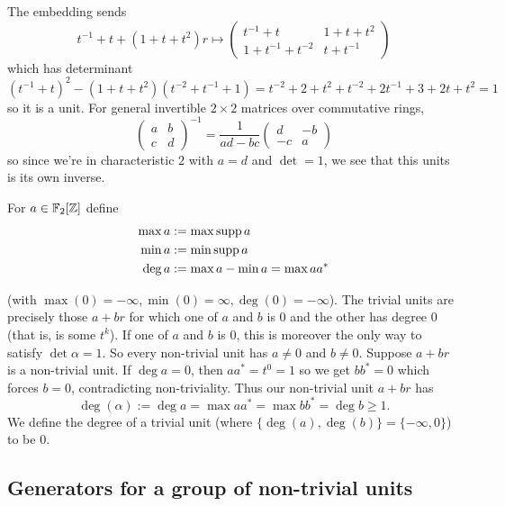 \begin{example}
    The embedding sends \[
        t^{-1} + t + (1 + t + t^2)r \mapsto \begin{pmatrix}
            t^{-1} + t & 1 + t + t^2 \\
            1 + t^{-1} + t^{-2} & t + t^{-1}
        \end{pmatrix}
    \] which has determinant \[
        (t^{-1} + t)^2  - (1 + t + t^2)(t^{-2} + t^{-1} + 1) = t^{-2} + 2 + t^2 + t^{-2} + 2t^{-1} + 3 + 2t + t^2 = 1
    \] so it is a unit.
    For general invertible $2 \times 2$ matrices over commutative rings, \[
        \begin{pmatrix}
            a & b \\
            c & d
        \end{pmatrix}^{-1}
        =
        \frac{1}{ad - bc}
        \begin{pmatrix}
            d & -b \\
            -c & a
        \end{pmatrix}
    \] so since we're in characteristic $2$ with $a = d$ and $\det = 1$, we see that this units is its own inverse.
\end{example}

For $a \in \mathbb{F}_2[\mathbb{Z}]$ define
\begin{align*}
    \max a &:= \max \operatorname{supp}{a} \\
    \min a &:= \min \operatorname{supp}{a} \\
    \deg a &:= \max a - \min a = \max aa^*
\end{align*}

(with $\max (0) = -\infty, \min(0) = \infty, \deg(0) = -\infty$).
The trivial units are precisely those $a + br$ for which one of $a$ and $b$ is $0$ and the other has degree $0$ (that is, is some $t^k$).
If one of $a$ and $b$ is $0$, this is moreover the only way to satisfy $\det \alpha = 1$.
So every non-trivial unit has $a \neq 0$ and $b \neq 0$.
Suppose $a + br$ is a non-trivial unit.
If $\deg a = 0$, then $a a^* = t^0 = 1$ so we get $b b^* = 0$ which forces $b = 0$, contradicting non-triviality.
Thus our non-trivial unit $a + br$ has \[
    \deg(\alpha) := \deg a = \max a a^* = \max b b^* = \deg b \geq 1.
\]
We define the degree of a trivial unit (where $\{\deg(a), \deg(b)\} = \{-\infty, 0\}$) to be $0$.

\subsection*{Generators for a group of non-trivial units}

